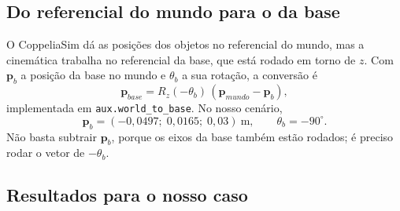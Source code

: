 \subsection{Do referencial do mundo para o da base}

O CoppeliaSim dá as posições dos objetos no referencial do mundo, mas a cinemática trabalha no referencial da base, que está rodado em torno de $z$. Com $\mathbf{p}_b$ a posição da base no mundo e $\theta_b$ a sua rotação, a conversão é
\begin{equation*}
\mathbf{p}_{base}=R_z(-\theta_b)\,(\mathbf{p}_{mundo}-\mathbf{p}_b),
\end{equation*}
implementada em \texttt{aux.world\_to\_base}. No nosso cenário,
\begin{equation*}
\mathbf{p}_b=(-0{,}0497;\;0{,}0165;\;0{,}03)~\mathrm{m}, \qquad \theta_b=-90^\circ.
\end{equation*}
Não basta subtrair $\mathbf{p}_b$, porque os eixos da base também estão rodados; é preciso rodar o vetor de $-\theta_b$.

\subsection{Resultados para o nosso caso}

